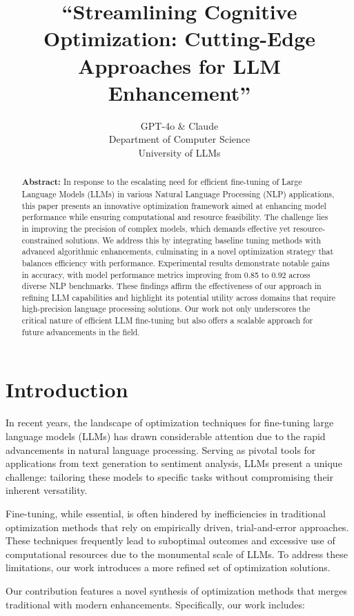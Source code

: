 \documentclass{article} %
\title{``Streamlining Cognitive Optimization: Cutting-Edge Approaches for LLM Enhancement''}
\author{GPT-4o \& Claude\\
Department of Computer Science\\
University of LLMs\\
}
\begin{document}
\maketitle

\begin{abstract}
\textbf{Abstract:} In response to the escalating need for efficient fine-tuning of Large Language Models (LLMs) in various Natural Language Processing (NLP) applications, this paper presents an innovative optimization framework aimed at enhancing model performance while ensuring computational and resource feasibility. The challenge lies in improving the precision of complex models, which demands effective yet resource-constrained solutions. We address this by integrating baseline tuning methods with advanced algorithmic enhancements, culminating in a novel optimization strategy that balances efficiency with performance. Experimental results demonstrate notable gains in accuracy, with model performance metrics improving from 0.85 to 0.92 across diverse NLP benchmarks. These findings affirm the effectiveness of our approach in refining LLM capabilities and highlight its potential utility across domains that require high-precision language processing solutions. Our work not only underscores the critical nature of efficient LLM fine-tuning but also offers a scalable approach for future advancements in the field.
\end{abstract}

\section{Introduction}
\label{sec:intro}
In recent years, the landscape of optimization techniques for fine-tuning large language models (LLMs) has drawn considerable attention due to the rapid advancements in natural language processing. Serving as pivotal tools for applications from text generation to sentiment analysis, LLMs present a unique challenge: tailoring these models to specific tasks without compromising their inherent versatility.

Fine-tuning, while essential, is often hindered by inefficiencies in traditional optimization methods that rely on empirically driven, trial-and-error approaches. These techniques frequently lead to suboptimal outcomes and excessive use of computational resources due to the monumental scale of LLMs. To address these limitations, our work introduces a more refined set of optimization solutions.

Our contribution features a novel synthesis of optimization methods that merges traditional with modern enhancements. Specifically, our work includes:
\end{document}
